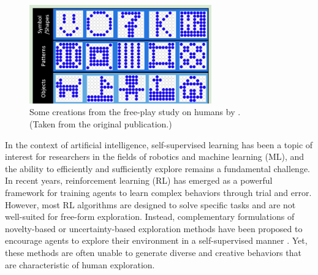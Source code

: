 \begin{figure}[h]
    \centering
    \includegraphics[width=0.7\textwidth]{images/diggs.png}
    \captionsetup{justification=centering}
    \caption[Some creations from the free-play study on humans by \cite{diggs}.]{Some creations from the free-play study on humans by \cite{diggs}.\\(Taken from the original publication.)}
    \label{fig:diggs}
\end{figure}


In the context of artificial intelligence, self-supervised learning has been a topic of interest for researchers in the fields of robotics and machine learning (ML), and the ability to efficiently and sufficiently explore remains a fundamental challenge.
In recent years, reinforcement learning (RL) has emerged as a powerful framework for training agents to learn complex behaviors through trial and error.
However, most RL algorithms are designed to solve specific tasks and are not well-suited for free-form exploration.
Instead, complementary formulations of novelty-based \cite{burda2018largescale,novel_explore} or uncertainty-based exploration \citep{rnd,plan_explore,disagreement} methods have been proposed to encourage agents to explore their environment in a self-supervised manner \citep{exploration_survey}. 
Yet, these methods are often unable to generate diverse and creative behaviors that are characteristic of human exploration.




